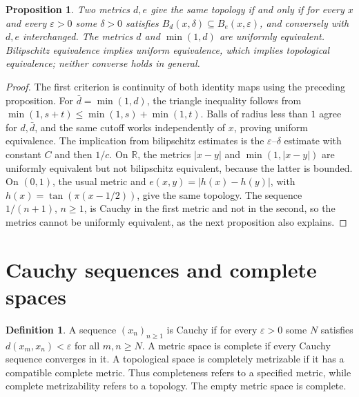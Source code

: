 \documentclass[11pt,oneside,openany]{book}
\newtheorem{proposition}[theorem]{Proposition}
\theoremstyle{definition}
\newtheorem{definition}[theorem]{Definition}
\theoremstyle{remark}
\newcommand{\R}{\mathbb R}\newcommand{\C}{\mathbb C}
\newcommand{\eps}{\varepsilon}
\begin{document}
\begin{proposition}\label{d10:09:metric-comparison}
Two metrics $d,e$ give the same topology if and only if for every $x$ and every $\eps>0$ some $\delta>0$ satisfies $B_d(x,\delta)\subseteq B_e(x,\eps)$, and conversely with $d,e$ interchanged. The metrics $d$ and $\min(1,d)$ are uniformly equivalent. Bilipschitz equivalence implies uniform equivalence, which implies topological equivalence; neither converse holds in general.
\end{proposition}
\begin{proof}
The first criterion is continuity of both identity maps using the preceding proposition. For $\bar d=\min(1,d)$, the triangle inequality follows from $\min(1,s+t)\leq\min(1,s)+\min(1,t)$. Balls of radius less than $1$ agree for $d,\bar d$, and the same cutoff works independently of $x$, proving uniform equivalence. The implication from bilipschitz estimates is the $\eps$--$\delta$ estimate with constant $C$ and then $1/c$. On $\R$, the metrics $|x-y|$ and $\min(1,|x-y|)$ are uniformly equivalent but not bilipschitz equivalent, because the latter is bounded. On $(0,1)$, the usual metric and $e(x,y)=|h(x)-h(y)|$, with $h(x)=\tan(\pi(x-1/2))$, give the same topology. The sequence $1/(n+1)$, $n\geq1$, is Cauchy in the first metric and not in the second, so the metrics cannot be uniformly equivalent, as the next proposition also explains.
\end{proof}

\section{Cauchy sequences and complete spaces}
\begin{definition}\label{d10:09:complete-definition}
A sequence $(x_n)_{n\geq1}$ is Cauchy if for every $\eps>0$ some $N$ satisfies $d(x_m,x_n)<\eps$ for all $m,n\geq N$. A metric space is complete if every Cauchy sequence converges in it. A topological space is completely metrizable if it has a compatible complete metric. Thus completeness refers to a specified metric, while complete metrizability refers to a topology. The empty metric space is complete.
\end{definition}
\end{document}
